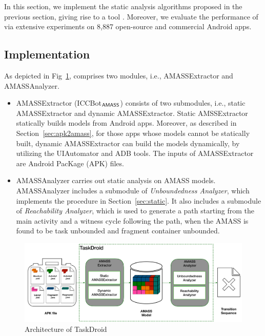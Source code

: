 
In this section,  we implement the static analysis algorithms proposed in the previous section, giving rise to %
a tool . Moreover, we evaluate the performance of {\tool} via extensive experiments 
on 8,887 open-source and commercial Android apps.  

\subsection{Implementation}\label{sec:impl}

As depicted in Fig~\ref{fig:taskdroid}, {\tool} comprises two modules, i.e., {\sf AMASSExtractor} and {\sf AMASSAnalyzer}. 

\begin{itemize}
\item {\sf AMASSExtractor} (ICCBot$_{\textsf{AMASS}}$) consists of two submodules, i.e., static {\sf AMASSExtractor} and dynamic {\sf AMASSExtractor}. Static {\sf AMSSExtractor} statically builds {\AMASS} models from Android apps. Moreover, as described in Section~\ref{sec:apk2amass}, for those apps whose {\AMASS} models cannot be statically built, dynamic {\sf AMASSExtractor} can build the {\AMASS} models dynamically, by utilizing the UIAutomator and ADB tools. The inputs of {\sf AMASSExtractor} are Android PacKage (APK)  files.
%
\item {\sf AMASSAnalyzer}  carries out static analysis on AMASS models. {\sf AMASSAnalyzer} includes a submodule of \emph{Unboundedness Analyzer},  which implements the procedure in Section~\ref{sec:static}. It also includes a submodule of \emph{Reachability Analyzer}, which is used to generate a path starting from the main activity and a witness cycle following the path, when the AMASS is found to be task unbounded and fragment container unbounded.
\end{itemize}

\begin{figure}[htbp]
	\centering
	\includegraphics[scale=0.23]{taskdroid.pdf}
	\caption{Architecture of TaskDroid}
	\label{fig:taskdroid}
\end{figure}

